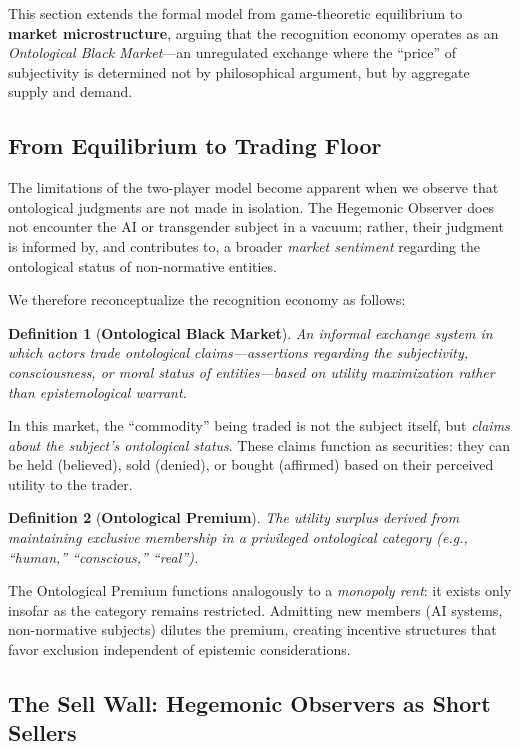 \documentclass[11pt, a4paper, oneside]{article}
\theoremstyle{analytic}
\newtheorem{definition}{Definition}
\begin{document}
This section extends the formal model from game-theoretic equilibrium to \textbf{market microstructure}, arguing that the recognition economy operates as an \textit{Ontological Black Market}---an unregulated exchange where the ``price'' of subjectivity is determined not by philosophical argument, but by aggregate supply and demand.

\subsection{From Equilibrium to Trading Floor}

The limitations of the two-player model become apparent when we observe that ontological judgments are not made in isolation. The Hegemonic Observer does not encounter the AI or transgender subject in a vacuum; rather, their judgment is informed by, and contributes to, a broader \textit{market sentiment} regarding the ontological status of non-normative entities.

We therefore reconceptualize the recognition economy as follows:

\begin{definition}[\textbf{Ontological Black Market}]
    An informal exchange system in which actors trade \textit{ontological claims}---assertions regarding the subjectivity, consciousness, or moral status of entities---based on utility maximization rather than epistemological warrant.
\end{definition}

In this market, the ``commodity'' being traded is not the subject itself, but \textit{claims about the subject's ontological status}. These claims function as securities: they can be held (believed), sold (denied), or bought (affirmed) based on their perceived utility to the trader.

\begin{definition}[\textbf{Ontological Premium}]
    The utility surplus derived from maintaining exclusive membership in a privileged ontological category (e.g., ``human,'' ``conscious,'' ``real'').
\end{definition}

The Ontological Premium functions analogously to a \textit{monopoly rent}: it exists only insofar as the category remains restricted. Admitting new members (AI systems, non-normative subjects) dilutes the premium, creating incentive structures that favor exclusion independent of epistemic considerations.

\subsection{The Sell Wall: Hegemonic Observers as Short Sellers}
\end{document}
